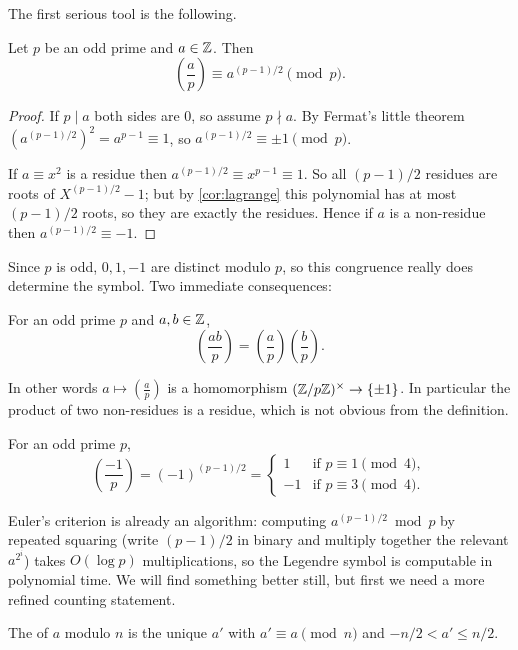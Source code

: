 \documentclass[a4paper]{scrartcl}
\newcommand{\leg}[2]{\left( \frac{#1}{#2} \right)}
\begin{document}
The first serious tool is the following.

\begin{theorem}\label{thm:euler}
	Let $p$ be an odd prime and $a \in \mathbb{Z}$. Then
	$$
	\leg ap \equiv a^{(p-1)/2} \pmod p.
	$$
\end{theorem}
\begin{proof}
	If $p \mid a$ both sides are $0$, so assume $p \nmid a$. By Fermat's little theorem $(a^{(p-1)/2})^2 = a^{p-1} \equiv 1$, so $a^{(p-1)/2} \equiv \pm 1 \pmod p$.

	If $a \equiv x^2$ is a residue then $a^{(p-1)/2} \equiv x^{p-1} \equiv 1$. So all $(p-1)/2$ residues are roots of $X^{(p-1)/2} - 1$; but by \autoref{cor:lagrange} this polynomial has at most $(p-1)/2$ roots, so they are exactly the residues. Hence if $a$ is a non-residue then $a^{(p-1)/2} \equiv -1$.
\end{proof}

Since $p$ is odd, $0, 1, -1$ are distinct modulo $p$, so this congruence really does determine the symbol. Two immediate consequences:

\begin{corollary}\label{cor:multiplicative}
	For an odd prime $p$ and $a, b \in \mathbb{Z}$,
	$$
	\leg{ab}p = \leg ap \leg bp.
	$$
\end{corollary}

In other words $a \mapsto \left( \frac ap \right)$ is a homomorphism $(\mathbb{Z}/p\mathbb{Z})^\times \to \{\pm 1\}$. In particular the product of two non-residues is a residue, which is not obvious from the definition.

\begin{corollary}\label{cor:minusone}
	For an odd prime $p$,
	$$
	\leg{-1}p = (-1)^{(p-1)/2} = \begin{cases}
		1 & \text{if } p \equiv 1 \pmod 4, \\
		-1 & \text{if } p \equiv 3 \pmod 4.
	\end{cases}
	$$
\end{corollary}

Euler's criterion is already an algorithm: computing $a^{(p-1)/2} \bmod p$ by repeated squaring (write $(p-1)/2$ in binary and multiply together the relevant $a^{2^i}$) takes $O(\log p)$ multiplications, so the Legendre symbol is computable in polynomial time. We will find something better still, but first we need a more refined counting statement.

\begin{definition}
	The  of $a$ modulo $n$ is the unique $a'$ with $a' \equiv a \pmod n$ and $-n/2 < a' \leq n/2$.
\end{definition}
\end{document}
